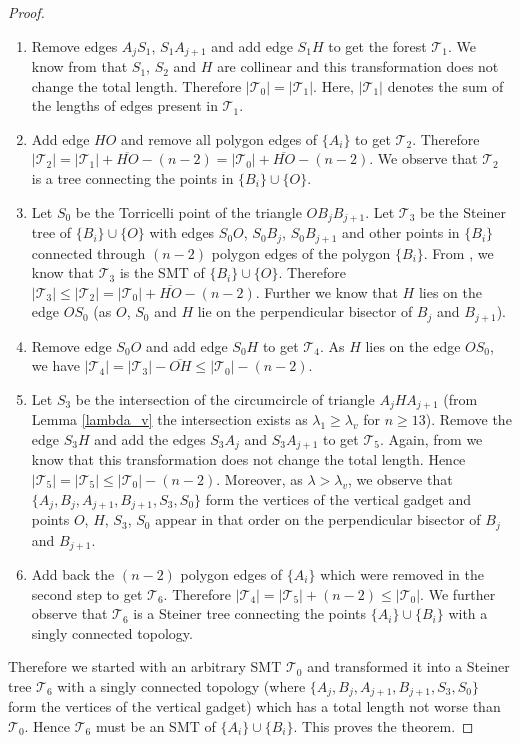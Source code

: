 \begin{proof}
\begin{enumerate}
    \item Remove edges $A_jS_1$, $S_1A_{j+1}$ and add edge $S_1H$ to get the forest $\mathcal{T}_1$. We know from \cite{hwang1992steiner} that $S_1$, $S_2$ and $H$ are collinear and this transformation does not change the total length. Therefore $|\mathcal{T}_0| = |\mathcal{T}_1|$. Here, $|\mathcal{T}_1|$ denotes the sum of the lengths of edges present in $\mathcal{T}_1$.
    \item Add edge $HO$ and remove all polygon edges of $\{A_i\}$ to get $\mathcal T_2$. Therefore $|\mathcal T_2| = |\mathcal T_1| + \overline{HO} - (n - 2) = |\mathcal T_0| + \overline{HO} - (n - 2)$. We observe that $\mathcal T_2$ is a tree connecting  the points in $\{B_i\} \cup \{O\}$.
    \item Let $S_0$ be the Torricelli point of the triangle $OB_jB_{j+1}$. Let $\mathcal T_3$ be the Steiner tree of $\{B_i\} \cup \{O\}$ with edges $S_0O$, $S_0B_j$, $S_0B_{j+1}$ and other points in $\{B_i\}$ connected through $(n - 2)$ polygon edges of the polygon $\{B_i\}$. From \cite{weng1995steiner}, we know that $\mathcal T_3$ is the SMT of $\{B_i\} \cup \{O\}$. Therefore $|\mathcal T_3| \le |\mathcal T_2| = |\mathcal T_0| + \overline{HO} - (n - 2)$. Further we know that $H$ lies on the edge $OS_0$ (as $O$, $S_0$ and $H$ lie on the perpendicular bisector of $B_j$ and $B_{j + 1}$).
    \item Remove edge $S_0O$ and add edge $S_0H$ to get $\mathcal T_4$. As $H$ lies on the edge $OS_0$, we have $|\mathcal T_4| = |\mathcal T_3| - \overline{OH} \le |\mathcal T_0| - (n - 2)$.
    \item Let $S_3$ be the intersection of the circumcircle of triangle $A_jHA_{j + 1}$ (from Lemma \ref{lambda_v} the intersection exists as $\lambda_1 \ge \lambda_v$ for $n \ge 13$). Remove the edge $S_3H$ and add the edges $S_3A_j$ and $S_3A_{j + 1}$ to get $\mathcal T_5$. Again, from \cite{hwang1992steiner} we know that this transformation does not change the total length. Hence $|\mathcal T_5| = |\mathcal T_5| \le |\mathcal T_0| - (n - 2)$. Moreover, as $\lambda > \lambda_v$, we observe that $\{A_j, B_j, A_{j+1}, B_{j+1}, S_3, S_0\}$ form the vertices of the vertical gadget and points $O$, $H$, $S_3$, $S_0$ appear in that order on the perpendicular bisector of $B_j$ and $B_{j+1}$.
    \item Add back the $(n - 2)$ polygon edges of $\{A_i\}$ which were removed in the second step to get $\mathcal T_6$. Therefore $|\mathcal T_4| = |\mathcal T_5| + (n - 2) \le |\mathcal T_0|$. We further observe that $\mathcal T_6$ is a Steiner tree connecting the points $\{A_i\} \cup \{B_i\}$ with a singly connected topology.
\end{enumerate}

Therefore we started with an arbitrary SMT $\mathcal T_0$ and transformed it into a Steiner tree $\mathcal T_6$ with a singly connected topology (where $\{A_j, B_j, A_{j+1}, B_{j+1}, S_3, S_0\}$ form the vertices of the vertical gadget) which has a total length not worse than $\mathcal T_0$. Hence $\mathcal T_6$ must be an SMT of $\{A_i\} \cup \{B_i\}$. This proves the theorem.
\end{proof}

